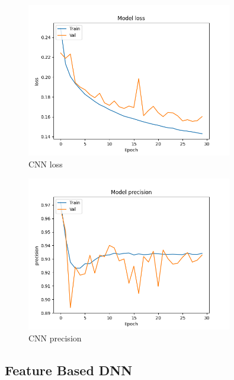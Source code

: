 \documentclass{article}
\begin{document}
    \begin{figure}[H]
        \centering
        \includegraphics[width=0.8\textwidth]{report_img/nn_results/feature_vector_cnn_26/metric_loss}
        \caption{CNN loss}
        \label{fig:}
    \end{figure}

    \begin{figure}[H]
        \centering
        \includegraphics[width=0.8\textwidth]{report_img/nn_results/feature_vector_cnn_26/metric_precision}
        \caption{CNN precision}
        \label{fig:}
    \end{figure}

    \subsection{Feature Based DNN}
\end{document}
